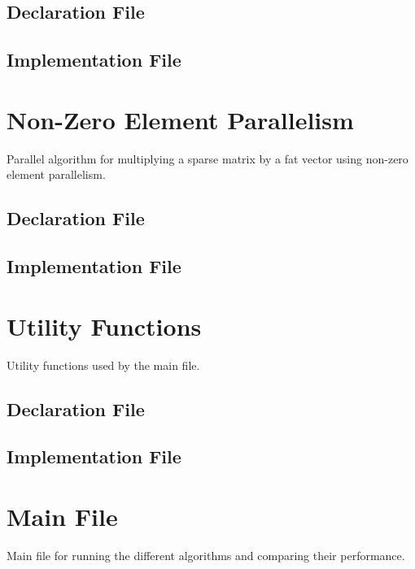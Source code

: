 \documentclass[12pt,oneside]{book} %
\begin{document}
\begin{subappendices}
    \subsection{Declaration File}
    
    \subsection{Implementation File}
    

    \section{Non-Zero Element Parallelism}\label{appendix:non-zero}
    Parallel algorithm for multiplying a sparse matrix by a fat vector using
    non-zero element parallelism.
    \subsection{Declaration File}
    
    \subsection{Implementation File}
    

    \section{Utility Functions}\label{appendix:utility}
    Utility functions used by the main file.
    \subsection{Declaration File}
    
    \subsection{Implementation File}
    

    \section{Main File}\label{appendix:main}
    Main file for running the different algorithms and comparing their performance.
    


\end{subappendices}
\end{document}

